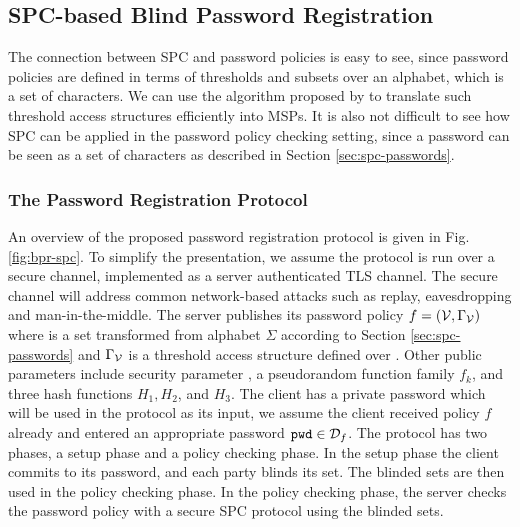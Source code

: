 \subsection{SPC-based Blind Password Registration}\label{sec:spc-bpr-protocol}

The connection between \acl{SPC} and password policies is easy to see, since password policies are defined in terms of thresholds and subsets over an alphabet, which is a set of characters.
We can use the algorithm proposed by \citet{LiuC10} to translate such threshold access structures efficiently into \acp{MSP}. 
It is also not difficult to see how \ac{SPC} can be applied in the password policy checking setting, since a password can be seen as a set of characters as described in Section \ref{sec:spc-passwords}. 

\subsubsection{The Password Registration Protocol}
An overview of the proposed password registration protocol is given in Fig. \ref{fig:bpr-spc}. 
To simplify the presentation, we assume the protocol is run over a secure channel, \eg implemented as a server authenticated \ac{TLS} channel. 
The secure channel will address common network-based attacks such as replay, eavesdropping and man-in-the-middle. 
The server publishes its password policy $f=(\mathcal{V},\Gamma_\mathcal{V})$ where \ServerSet is a set transformed from alphabet $\Sigma$ according to Section \ref{sec:spc-passwords} and $\Gamma_\mathcal{V}$ is a threshold access structure defined over \ServerSet. 
Other public parameters include security parameter \secpar, a pseudorandom function family $f_k$, and three hash functions $H_1, H_2$, and $H_3$. 
The client has a private password \pwd which will be used in the protocol as its input, \ie we assume the client received policy $f$ already and entered an appropriate password $\mathtt{pwd}\in\mathcal{D}_f$. 
The protocol has two phases, a setup phase and a policy checking phase. 
In the setup phase the client commits to its password, and each party blinds its set. 
The blinded sets are then used in the policy checking phase. In the policy checking phase, the server checks the password policy with a secure \ac{SPC} protocol using the blinded sets.

